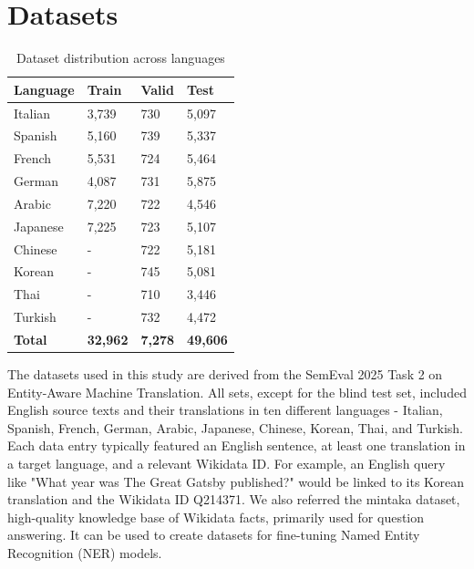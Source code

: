 \documentclass[final]{ecai}
\begin{document}
\section{Datasets}
\label{sec:datasets}

\begin{table}[h!]
\centering
\begin{tabular}{ll@{\hspace{8mm}}ll}
\hline
\textbf{Language} & \textbf{Train} & \textbf{Valid} & \textbf{Test} \\
\hline
Italian & 3,739 & 730 & 5,097 \\
Spanish & 5,160 & 739 & 5,337 \\
French & 5,531 & 724 & 5,464 \\
German & 4,087 & 731 & 5,875 \\
Arabic & 7,220 & 722 & 4,546 \\
Japanese & 7,225 & 723 & 5,107 \\
Chinese & - & 722 & 5,181 \\
Korean & - & 745 & 5,081 \\
Thai & - & 710 & 3,446 \\
Turkish & - & 732 & 4,472 \\
\hline
\textbf{Total} & \textbf{32,962} & \textbf{7,278} & \textbf{49,606} \\
\hline
\end{tabular}
\caption{Dataset distribution across languages}
\label{tab:dataset_distribution}
\end{table}

The datasets used in this study are derived from the SemEval 2025 Task 2 on Entity-Aware Machine Translation.
All sets, except for the blind test set, included English source texts and their translations in ten 
different languages - Italian, Spanish, French, German, Arabic, Japanese, Chinese, Korean, Thai, and Turkish. 
Each data entry typically featured an English sentence, at least one translation in a target language, 
and a relevant Wikidata ID. 
For example, an English query like "What year was The Great Gatsby published?" 
would be linked to its Korean translation and the Wikidata ID Q214371. We also referred the mintaka\cite{sen-etal-2022-mintaka} dataset,
high-quality knowledge base of Wikidata facts, primarily used for question answering. It can be used to create
datasets for fine-tuning Named Entity Recognition (NER) models.

\end{document}
